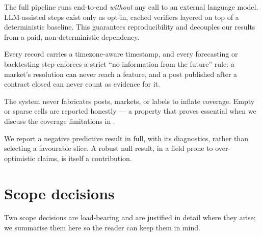 \begin{description}[leftmargin=1.4em,style=nextline]
  \item[Deterministic core, optional intelligence.] The full pipeline runs
  end-to-end \emph{without} any call to an external language model. LLM-assisted
  steps exist only as opt-in, cached verifiers layered on top of a deterministic
  baseline. This guarantees reproducibility and decouples our results from a paid,
  non-deterministic dependency.
  \item[Time discipline and no leakage.] Every record carries a timezone-aware
  timestamp, and every forecasting or backtesting step enforces a strict
  ``no information from the future'' rule: a market's resolution can never reach a
  feature, and a post published after a contract closed can never count as evidence
  for it.
  \item[No invented data.] The system never fabricates posts, markets, or labels to
  inflate coverage. Empty or sparse cells are reported honestly --- a property that
  proves essential when we discuss the coverage limitations in
  .
  \item[Honest reporting.] We report a negative predictive result in full, with its
  diagnostics, rather than selecting a favourable slice. A robust null result, in a
  field prone to over-optimistic claims, is itself a contribution.
\end{description}

\section{Scope decisions}
\label{sec:scope}
Two scope decisions are load-bearing and are justified in detail where they arise;
we summarise them here so the reader can keep them in mind.

